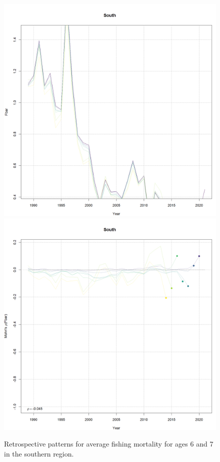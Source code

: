 \documentclass[
]{article}
\begin{document}
\begin{figure}

{\centering \includegraphics[width=0.65\linewidth]{../2023.RT.Runs/Run34/plots_png/retro/South_Fbar_retro} \includegraphics[width=0.65\linewidth]{../2023.RT.Runs/Run34/plots_png/retro/South_Fbar_retro_relative} 

}

\caption{Retrospective patterns for average fishing mortality for ages 6 and 7 in the southern region.}\label{fig:South-retro-F}
\end{figure}
\end{document}
